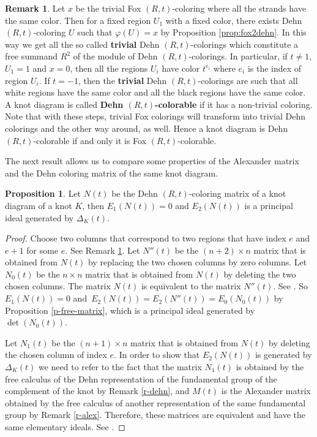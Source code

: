 \documentclass[11pt,a4paper]{article}
\theoremstyle{definition}
\newtheorem{proposition}[theorem]{Proposition}
\newtheorem{remark}[theorem]{Remark}
\begin{document}
\begin{remark}\label{r-trivial-Dehn-col}
Let $x$ be the trivial Fox $(R,t)$-coloring where all the strands have the same color. Then for a fixed region $U_1$ with a fixed color, there exists Dehn $(R,t)$-coloring $U$ such that $\varphi (U)=x$ by Proposition \ref{prop:fox2dehn}. In this way we get all the so called \textbf{trivial} Dehn $(R,t)$-colorings which constitute a free summand $R^2$ of the module of Dehn $(R,t)$-colorings.
In particular, if $t\not=1$, $U_1=1$ and $x=0$, then all the regions $U_i$ have color $t^{e_i}$ where $e_i$ is the index of region $U_i$.
If $t=-1$, then the \textbf{trivial} Dehn $(R,t)$-colorings are such that all white regions have the same color and all the black regions have the same color.
A knot diagram is called \textbf{Dehn $(R,t)$-colorable} if it has a non-trivial coloring. Note that with these steps, trivial Fox colorings will transform into trivial Dehn colorings and the other way around, as well. Hence a knot diagram is Dehn $(R,t)$-colorable if and only it is Fox $(R,t)$-colorable.
\end{remark}



The next result allows us to compare some properties of the Alexander matrix and the Dehn coloring matrix of the same knot diagram.


\begin{proposition}\label{p-elem-id-dehn}
Let $N(t)$ be the Dehn $(R,t)$-coloring matrix of a knot diagram of a knot $K$,  
then $E_1(N(t))=0$ and $E_2(N(t))$ is a principal ideal generated by $\Delta_K(t)$.
\end{proposition}

\begin{proof}Choose two columns that correspond to two regions that have index $e$ and $e+1$ for some $e$. See Remark \ref{r-trivial-Dehn-col}.
Let $N''(t)$ be the $(n+2) \times n$ matrix  that is obtained from $N(t)$ by replacing the two chosen columns by zero columns.
Let $N_0(t)$ be the $n \times n$ matrix  that is obtained from $N(t)$ by deleting the two chosen columns.
The matrix $N(t)$ is equivalent to the matrix $N''(t)$. See \cite[pp. 280]{alexander1928topological}. 
So $E_1(N(t))=0$ and~$E_2(N(t))=E_2(N''(t))=E_0(N_0(t))$ by Proposition \ref{p-free-matrix}, which is a principal ideal generated by $\det (N_0(t))$.


Let $N_1(t)$ be the $(n+1) \times n$ matrix  that is obtained from $N(t)$ by deleting the chosen column of index $e$. In order to show that $E_2(N(t))$ is generated by $\Delta_K(t)$ we need to refer 
to the fact that the matrix $N_1(t)$ is obtained by the free calculus of 
the Dehn representation of the fundamental group of the complement of the knot by Remark \ref{r-dehn}, 
and $M(t)$ is the Alexander matrix obtained by the free calculus of 
another representation of the same fundamental group by Remark \ref{r-alex}. 
Therefore, these matrices are equivalent and have the same elementary ideals. 
See \cite[Chapter VII (4.5)]{crowell2012introduction}.
\end{proof}
\end{document}
